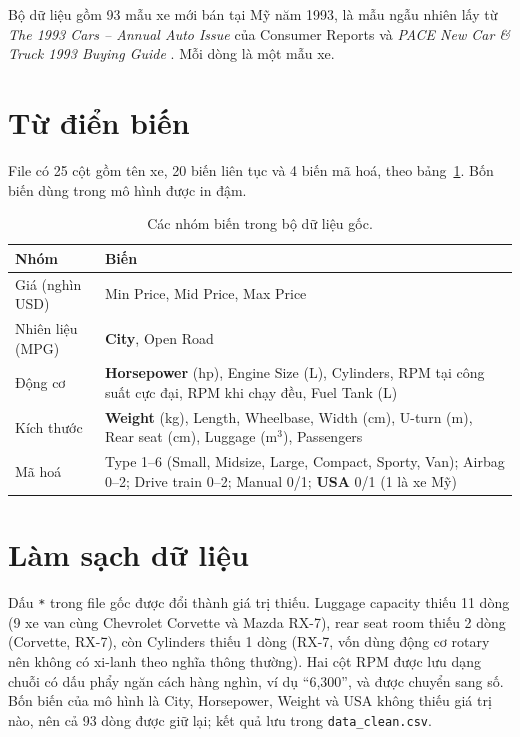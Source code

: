 \documentclass[12pt,a4paper]{report}
\begin{document}
Bộ dữ liệu gồm 93 mẫu xe mới bán tại Mỹ năm 1993, là mẫu ngẫu nhiên lấy từ
\emph{The 1993 Cars -- Annual Auto Issue} của Consumer Reports
\cite{consumerreports1993} và \emph{PACE New Car \& Truck 1993 Buying Guide}
\cite{pace1993}. Mỗi dòng là một mẫu xe.

\section{Từ điển biến}

File có 25 cột gồm tên xe, 20 biến liên tục và 4 biến mã hoá, theo
bảng~\ref{tab:variables}. Bốn biến dùng trong mô hình được in đậm.

\begin{table}[tp]
  \centering
  \caption{Các nhóm biến trong bộ dữ liệu gốc.}
  \label{tab:variables}
  \begin{tabular}{l>{\raggedright\arraybackslash}p{12.5cm}}
    \toprule
    Nhóm & Biến \\
    \midrule
    Giá (nghìn USD) & Min Price, Mid Price, Max Price \\
    Nhiên liệu (MPG) & \textbf{City}, Open Road \\
    Động cơ & \textbf{Horsepower} (hp), Engine Size (L), Cylinders, RPM tại công suất cực đại,
      RPM khi chạy đều, Fuel Tank (L) \\
    Kích thước & \textbf{Weight} (kg), Length, Wheelbase, Width (cm), U-turn (m),
      Rear seat (cm), Luggage (m$^3$), Passengers \\
    Mã hoá & Type 1--6 (Small, Midsize, Large, Compact, Sporty, Van); Airbag 0--2;
      Drive train 0--2; Manual 0/1; \textbf{USA} 0/1 (1 là xe Mỹ) \\
    \bottomrule
  \end{tabular}
\end{table}

\section{Làm sạch dữ liệu}
\label{sec:cleaning}

Dấu \texttt{*} trong file gốc được đổi thành giá trị thiếu. Luggage capacity
thiếu 11 dòng (9 xe van cùng Chevrolet Corvette và Mazda RX-7), rear seat room
thiếu 2 dòng (Corvette, RX-7), còn Cylinders thiếu 1 dòng (RX-7, vốn dùng động
cơ rotary nên không có xi-lanh theo nghĩa thông thường). Hai cột RPM được lưu
dạng chuỗi có dấu phẩy ngăn cách hàng nghìn, ví dụ ``6,300'', và được chuyển
sang số. Bốn biến của mô hình là City, Horsepower, Weight và USA không thiếu giá
trị nào, nên cả 93 dòng được giữ lại; kết quả lưu trong \texttt{data\_clean.csv}.
\end{document}
